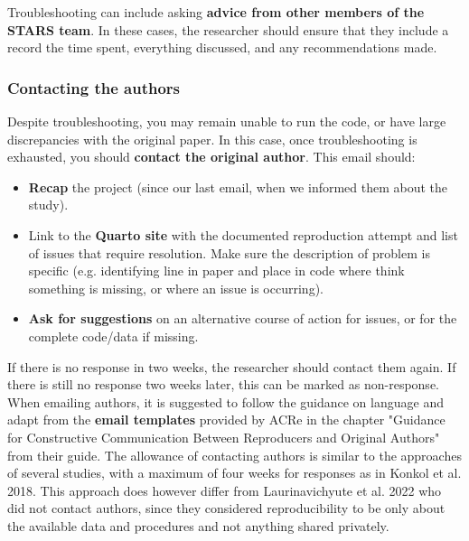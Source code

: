 Troubleshooting can include asking \textbf{advice from other members of the STARS team}. In these cases, the researcher should ensure that they include a record the time spent, everything discussed, and any recommendations made.

\vspace{0.5cm}
\subsubsection{Contacting the authors}

Despite troubleshooting, you may remain unable to run the code, or have large discrepancies with the original paper. In this case, once troubleshooting is exhausted, you should \textbf{contact the original author}. This email should:
\begin{itemize}
    \item \textbf{Recap} the project (since our last email, when we informed them about the study).
    \item Link to the \textbf{Quarto site} with the documented reproduction attempt and list of issues that require resolution. Make sure the description of problem is specific (e.g. identifying line in paper and place in code where think something is missing, or where an issue is occurring).
    \item \textbf{Ask for suggestions} on an alternative course of action for issues, or for the complete code/data if missing.
\end{itemize}

If there is no response in two weeks, the researcher should contact them again. If there is still no response two weeks later, this can be marked as non-response. When emailing authors, it is suggested to follow the guidance on language and adapt from the \textbf{email templates} provided by ACRe in the chapter "Guidance for Constructive Communication Between Reproducers and Original Authors" from their guide.\autocite{berkeley_initiative_for_transparency_in_the_social_sciences_guide_2022} The allowance of contacting authors is similar to the approaches of several studies,\autocite{krafczyk_learning_2021,wood_push_2018,berkeley_initiative_for_transparency_in_the_social_sciences_guide_2022,hardwicke_analytic_2021,konkol_computational_2019} with a maximum of four weeks for responses as in Konkol et al. 2018\autocite{konkol_computational_2019}. This approach does however differ from Laurinavichyute et al. 2022\autocite{laurinavichyute_share_2022} who did not contact authors, since they considered reproducibility to be only about the available data and procedures and not anything shared privately.\autocite{laurinavichyute_share_2022}

